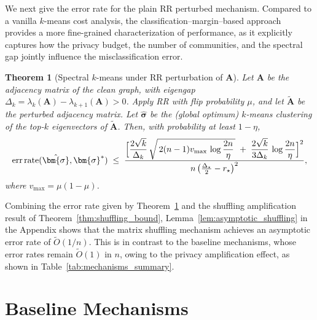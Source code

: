 \documentclass[11pt]{article}
\theoremstyle{plain}
\newtheorem{theorem}{Theorem}[section]
\theoremstyle{definition}
\theoremstyle{remark}
\begin{document}
We next give the error rate for the plain RR perturbed mechanism. %
Compared to a vanilla $k$-means cost analysis, the classification–margin–based approach provides a more fine-grained characterization of performance, as it explicitly captures how the privacy budget, the number of communities, and the spectral gap jointly influence the misclassification error. 
\begin{theorem}[Spectral $k$-means under RR perturbation of $\mathbf{A}$]
\label{thm:main_explicit}
Let $\mathbf{A}$ be the adjacency matrix of the clean graph, with eigengap 
$\Delta_k=\lambda_{k}(\mathbf{A})-\lambda_{k+1}(\mathbf{A})>0$. 
Apply RR with flip probability $\mu$, and let $\widetilde{\mathbf{A}}$ be the perturbed adjacency matrix. 
Let $\hat{\bm{\sigma}}$ be the (global optimum) $k$-means clustering of the top-$k$ eigenvectors of $\widetilde{\mathbf{A}}$. 
Then, with probability at least $1-\eta$,
\begin{equation*}
\begin{aligned}
\mathrm{err\,rate}(\hat{\bm{\sigma}},\bm{\sigma}^\ast)  \;\le\;
\frac{\Bigl[
\displaystyle \frac{2\sqrt{k}}{\Delta_k}\,\sqrt{\,2(n-1)v_{\max}\,\log\frac{2n}{\eta}\,}
\;+\;\frac{2\sqrt{k}}{3\Delta_k}\,\log\frac{2n}{\eta}
\Bigr]^2}
{n \, \bigl(\tfrac{\Delta_\star}{2}-r_\star\bigr)^2},
\end{aligned}
\end{equation*}
where $v_{\max}=\mu(1-\mu)$. 
\end{theorem}
Combining the error rate given by Theorem~\ref{thm:main_explicit} and the shuffling amplification result of Theorem~\ref{thm:shuffling_bound}, Lemma~\ref{lem:asymptotic_shuffling} in the Appendix shows that the matrix shuffling mechanism achieves an asymptotic error rate of $\tilde O(1/n)$. This is in contrast to the baseline mechanisms, whose error rates remain $\tilde{O}(1)$ in $n$, owing to the privacy amplification effect, as shown in Table~\ref{tab:mechanisms_summary}.










\section{Baseline Mechanisms}
\end{document}
